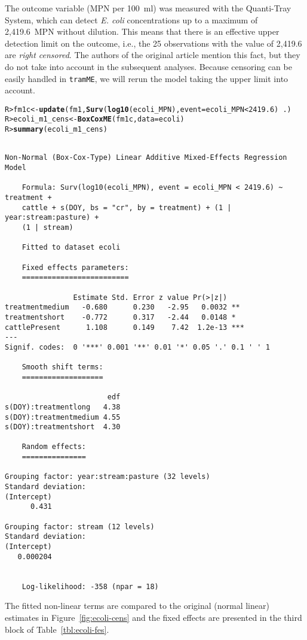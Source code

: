 \documentclass[11pt]{article}\usepackage[]{graphicx}\usepackage{xcolor}
\makeatletter
\newcommand{\hlnum}[1]{\textcolor[rgb]{0.686,0.059,0.569}{#1}}%
\newcommand{\hlopt}[1]{\textcolor[rgb]{0,0,0}{#1}}%
\newcommand{\hlstd}[1]{\textcolor[rgb]{0.345,0.345,0.345}{#1}}%
\newcommand{\hlkwb}[1]{\textcolor[rgb]{0.69,0.353,0.396}{#1}}%
\newcommand{\hlkwc}[1]{\textcolor[rgb]{0.333,0.667,0.333}{#1}}%
\newcommand{\hlkwd}[1]{\textcolor[rgb]{0.737,0.353,0.396}{\textbf{#1}}}%
\newenvironment{kframe}{%
 \def\at@end@of@kframe{}%
 \ifinner\ifhmode%
  \def\at@end@of@kframe{\end{minipage}}%
  \begin{minipage}{\columnwidth}%
 \fi\fi%
 \def\FrameCommand##1{\hskip\@totalleftmargin \hskip-\fboxsep
 \colorbox{shadecolor}{##1}\hskip-\fboxsep
     \hskip-\linewidth \hskip-\@totalleftmargin \hskip\columnwidth}%
 \MakeFramed {\advance\hsize-\width
   \@totalleftmargin\z@ \linewidth\hsize
   \@setminipage}}%
 {\par\unskip\endMakeFramed%
 \at@end@of@kframe}
\newenvironment{knitrout}{}{} %
\newcommand{\pkg}[1]{\texttt{#1}}
\newcommand{\0}{{\mathbf{0}}}
\makeatother
\begin{document}
The outcome variable (MPN per 100~ml)
was measured with the Quanti-Tray System,
which can detect \emph{E. coli} concentrations
up to a maximum of 2,419.6~MPN without dilution.
This means that there is an effective upper detection limit
on the outcome,
i.e., the 25 observations with
the value of 2,419.6 are \emph{right censored}.
The authors of the original article mention this fact,
but they do not take into account in the subsequent analyses.
Because censoring can be easily handled in \pkg{tramME},
we will rerun the model taking the upper limit into account.
%
\begin{knitrout}\small
{}\color{fgcolor}\begin{kframe}
\begin{alltt}
\hlstd{R> }\hlstd{fm1c} \hlkwb{<-} \hlkwd{update}\hlstd{(fm1,} \hlkwd{Surv}\hlstd{(}\hlkwd{log10}\hlstd{(ecoli_MPN),} \hlkwc{event} \hlstd{= ecoli_MPN} \hlopt{<} \hlnum{2419.6}\hlstd{)} \hlopt{~} \hlstd{.)}
\hlstd{R> }\hlstd{ecoli_m1_cens} \hlkwb{<-} \hlkwd{BoxCoxME}\hlstd{(fm1c,} \hlkwc{data} \hlstd{= ecoli)}
\hlstd{R> }\hlkwd{summary}\hlstd{(ecoli_m1_cens)}
\end{alltt}
\begin{verbatim}

Non-Normal (Box-Cox-Type) Linear Additive Mixed-Effects Regression Model

	Formula: Surv(log10(ecoli_MPN), event = ecoli_MPN < 2419.6) ~ treatment + 
    cattle + s(DOY, bs = "cr", by = treatment) + (1 | year:stream:pasture) + 
    (1 | stream)

	Fitted to dataset ecoli  

	Fixed effects parameters:
	=========================

                Estimate Std. Error z value Pr(>|z|)    
treatmentmedium   -0.680      0.230   -2.95   0.0032 ** 
treatmentshort    -0.772      0.317   -2.44   0.0148 *  
cattlePresent      1.108      0.149    7.42  1.2e-13 ***
---
Signif. codes:  0 '***' 0.001 '**' 0.01 '*' 0.05 '.' 0.1 ' ' 1

	Smooth shift terms:
	===================

                        edf
s(DOY):treatmentlong   4.38
s(DOY):treatmentmedium 4.55
s(DOY):treatmentshort  4.30

	Random effects:
	===============

Grouping factor: year:stream:pasture (32 levels)
Standard deviation:
(Intercept) 
      0.431 

Grouping factor: stream (12 levels)
Standard deviation:
(Intercept) 
   0.000204 


	Log-likelihood: -358 (npar = 18)
\end{verbatim}
\end{kframe}
\end{knitrout}
%
The fitted non-linear terms are compared to the original
(normal linear) estimates in Figure~\ref{fig:ecoli-cens}
and the fixed effects are presented in the third block of Table~\ref{tbl:ecoli-fes}.
\end{document}
